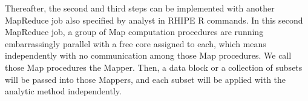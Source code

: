 Thereafter, the second and
third steps can be implemented with another MapReduce job also specified by
analyst in RHIPE R commands. In this second MapReduce job, a group of Map
computation procedures are running embarrassingly parallel with a free core 
assigned to each, which means independently with no communication among those Map
procedures. We call those Map procedures the Mapper. Then, a data block or a 
collection of subsets will be passed into those Mappers, and each subset
will be applied with the analytic method independently.

